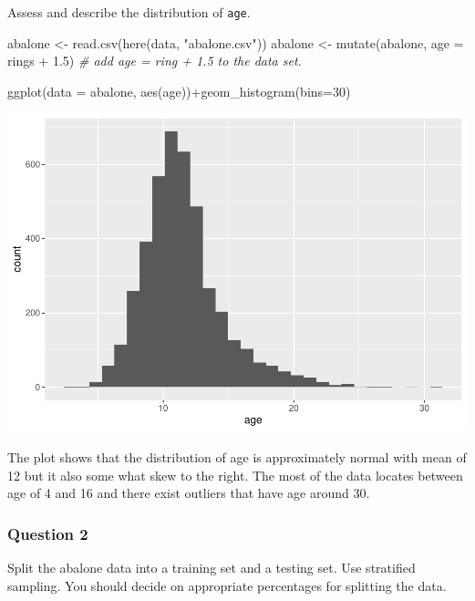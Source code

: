 \documentclass[
]{article}
\newenvironment{Shaded}{\begin{snugshade}}{\end{snugshade}}
\newcommand{\AttributeTok}[1]{\textcolor[rgb]{0.77,0.63,0.00}{#1}}
\newcommand{\CommentTok}[1]{\textcolor[rgb]{0.56,0.35,0.01}{\textit{#1}}}
\newcommand{\DecValTok}[1]{\textcolor[rgb]{0.00,0.00,0.81}{#1}}
\newcommand{\FloatTok}[1]{\textcolor[rgb]{0.00,0.00,0.81}{#1}}
\newcommand{\FunctionTok}[1]{\textcolor[rgb]{0.00,0.00,0.00}{#1}}
\newcommand{\NormalTok}[1]{#1}
\newcommand{\OtherTok}[1]{\textcolor[rgb]{0.56,0.35,0.01}{#1}}
\newcommand{\SpecialCharTok}[1]{\textcolor[rgb]{0.00,0.00,0.00}{#1}}
\newcommand{\StringTok}[1]{\textcolor[rgb]{0.31,0.60,0.02}{#1}}
\begin{document}
Assess and describe the distribution of \texttt{age}.

\begin{Shaded}
\begin{Highlighting}[]
\NormalTok{abalone }\OtherTok{\textless{}{-}} \FunctionTok{read.csv}\NormalTok{(}\FunctionTok{here}\NormalTok{(}\StringTok{\textquotesingle{}data\textquotesingle{}}\NormalTok{, }\StringTok{"abalone.csv"}\NormalTok{))}
\NormalTok{abalone }\OtherTok{\textless{}{-}} \FunctionTok{mutate}\NormalTok{(abalone, }\AttributeTok{age =}\NormalTok{ rings }\SpecialCharTok{+} \FloatTok{1.5}\NormalTok{) }\CommentTok{\# add age = ring + 1.5 to the data set.}


\FunctionTok{ggplot}\NormalTok{(}\AttributeTok{data =}\NormalTok{ abalone, }\FunctionTok{aes}\NormalTok{(age))}\SpecialCharTok{+}\FunctionTok{geom\_histogram}\NormalTok{(}\AttributeTok{bins=}\DecValTok{30}\NormalTok{)}
\end{Highlighting}
\end{Shaded}

\includegraphics{homework-2_files/figure-latex/unnamed-chunk-1-1.pdf}

The plot shows that the distribution of age is approximately normal with
mean of 12 but it also some what skew to the right. The most of the data
locates between age of 4 and 16 and there exist outliers that have age
around 30.

\hypertarget{question-2}{%
\subsubsection{Question 2}\label{question-2}}

Split the abalone data into a training set and a testing set. Use
stratified sampling. You should decide on appropriate percentages for
splitting the data.
\end{document}
